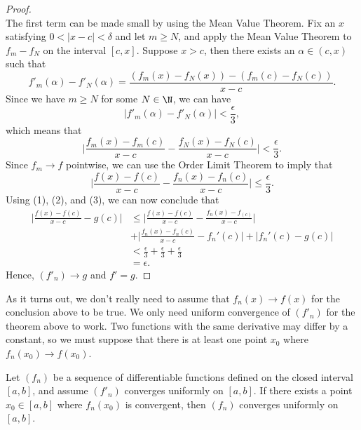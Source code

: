 \begin{proof}
    \[   \]
    The first term can be made small by using the Mean Value Theorem. Fix an \( x  \) satisfying \( 0 < | x - c  | < \delta  \) and let \( m \geq N  \), and apply the Mean Value Theorem to \( f_m - f_N  \) on the interval \( [c,x] \). Suppose \( x > c  \), then there exists an \( \alpha \in (c,x) \) such that 
    \[  f'_m(\alpha) - f'_N(\alpha)  = \frac{ (f_m(x) - f_N(x)) - (f_m(c) - f_N(c) ) }{ x - c  }. \]
    Since we have \( m \geq N  \) for some \( N \in \N  \), we can have 
    \[  | f'_m(\alpha) - f'_N(\alpha)  | < \frac{ \epsilon  }{ 3 }, \]
    which means that 
    \[  \Bigg| \frac{ f_m(x) - f_m(c)  }{ x -c  } - \frac{ f_N(x) - f_N(c)  }{  x- c  }  \Bigg| < \frac{ \epsilon  }{ 3 }. \tag{3} \] 
    Since \( f_m \to f  \) pointwise, we can use the Order Limit Theorem to imply that 
    \[  \Big| \frac{ f(x) - f(c)   }{ x- c  } - \frac{ f_n(x) - f_n(c)  }{ x - c  }  \Big| \leq \frac{ \epsilon  }{ 3 }. \]
    Using (1), (2), and (3), we can now conclude that  
    \begin{align*}
        \Big| \frac{ f(x) - f(c)  }{ x - c  } - g(c)  \Big| &\leq \Big| \frac{ f(x) - f(c)  }{  x- c  } - \frac{ f_n(x) - f_(c)  }{ x - c  }  \Big| \\ &+ \Big| \frac{ f_n(x) - f_n(c)  }{ x - c  } - f_n'(c)  \Big|  + | f_n'(c) - g(c)   | \\
                                                            &< \frac{ \epsilon  }{ 3  }  + \frac{ \epsilon  }{ 3  } + \frac{ \epsilon  }{ 3  } \\
                                                            &=\epsilon.
    \end{align*}
    Hence, \( (f'_n) \to g  \) and \( f' = g  \).
\end{proof}

As it turns out, we don't really need to assume that \( f_n(x) \to f(x)  \) for the conclusion above to be true. We only need uniform convergence of \( (f'_n)  \) for the theorem above to work. Two functions with the same derivative may differ by a constant, so we must suppose that there is at least one point \( x_0  \) where \( f_n(x_0) \to f(x_0)  \).

\begin{tcolorbox}
\begin{thm}
    Let \( (f_n)  \) be a sequence of differentiable functions defined on the closed interval \( [a,b]  \), and assume \( (f'_n)  \) converges uniformly on \( [a,b]  \). If there exists a point \( x_0 \in [a,b]  \) where \( f_n(x_0)  \) is convergent, then \( (f_n)  \) converges uniformly on \( [a,b]  \).
\end{thm}
\end{tcolorbox}

